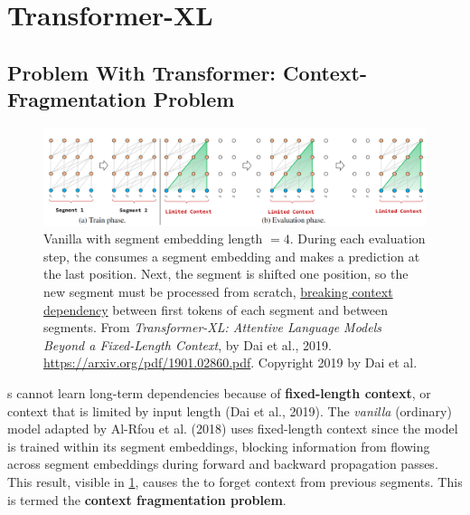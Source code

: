 \section{Transformer-XL} \label{sec:TransformerXL}

\subsection{Problem With Transformer: Context-Fragmentation Problem} \label{sec:ContextFragmentationProblem}


\begin{figure}[h]
\vspace{-5pt}
\centering
\includegraphics[width=\linewidth]{imgs/transXL_vanillaSegmentation.png}
\caption{Vanilla  with segment embedding length $ = 4$. During each evaluation step, the  consumes a segment embedding and makes a prediction at the last position. Next, the segment is shifted one position, so the new segment must be processed from scratch, \hyperref[sec:ContextFragmentationProblem]{breaking context dependency} between first tokens of each segment and between segments. From \emph{Transformer-XL: Attentive Language Models Beyond a Fixed-Length Context}, by Dai et al., 2019. \url{https://arxiv.org/pdf/1901.02860.pdf}. Copyright 2019 by Dai et al.}
\label{fig:transXL_VanillaSegment}
\end{figure}

s cannot learn long-term dependencies because of {\label{sec:FixedLengthContext} \textbf{fixed-length context}}, or context that is limited by input length (Dai et al., 2019). The \emph{vanilla} (ordinary)  model adapted by Al-Rfou et al. (2018) uses fixed-length context since the model is trained within its segment embeddings, blocking information from flowing across segment embeddings during forward and backward propagation passes. %
This result, visible in \cref{fig:transXL_VanillaSegment}, causes the  to forget context from previous segments. This is termed the \textbf{context fragmentation problem}.


